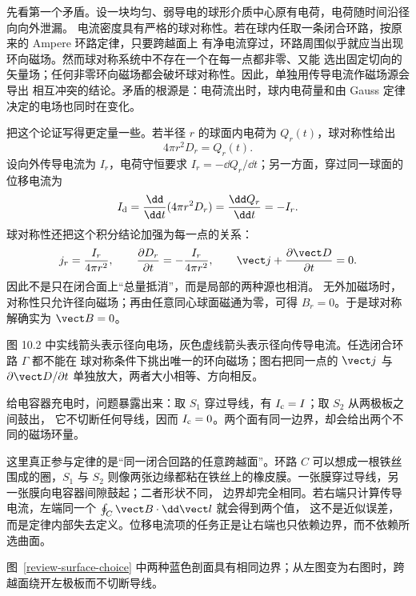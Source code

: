 先看第一个矛盾。设一块均匀、弱导电的球形介质中心原有电荷，电荷随时间沿径向向外泄漏。
电流密度具有严格的球对称性。若在球内任取一条闭合环路，按原来的 Ampere 环路定律，只要跨越面上
有净电流穿过，环路周围似乎就应当出现环向磁场。然而球对称系统中不存在一个在每一点都非零、又能
选出固定切向的矢量场；任何非零环向磁场都会破坏球对称性。因此，单独用传导电流作磁场源会导出
相互冲突的结论。矛盾的根源是：电荷流出时，球内电荷量和由 Gauss 定律决定的电场也同时在变化。

把这个论证写得更定量一些。若半径 $r$ 的球面内电荷为 $Q_r(t)$，球对称性给出
\begin{equation}
  4\pi r^2D_r=Q_r(t).
\end{equation}
设向外传导电流为 $I_r$，电荷守恒要求 $I_r=-\dd Q_r/\dd t$；另一方面，穿过同一球面的位移电流为
\begin{equation}
  I_{\rm d}=\frac{\dd}{\dd t}(4\pi r^2D_r)=\frac{\dd Q_r}{\dd t}=-I_r.
\end{equation}
球对称性还把这个积分结论加强为每一点的关系：
\[
 j_r=\frac{I_r}{4\pi r^2},\qquad
 \frac{\partial D_r}{\partial t}=-\frac{I_r}{4\pi r^2},
 \qquad \vect j+\frac{\partial\vect D}{\partial t}=0.
\]
因此不是只在闭合面上“总量抵消”，而是局部的两种源也相消。
无外加磁场时，对称性只允许径向磁场；再由任意同心球面磁通为零，可得 $B_r=0$。于是球对称解确实为 $\vect B=0$。

图 10.2 中实线箭头表示径向电场，灰色虚线箭头表示径向传导电流。任选闭合环路 $\Gamma$ 都不能在
球对称条件下挑出唯一的环向磁场；图右把同一点的 $\vect j$ 与 $\partial\vect D/\partial t$ 单独放大，两者大小相等、方向相反。

\radialCurrentSphereDiagram

给电容器充电时，问题暴露出来：取 $S_1$ 穿过导线，有 $I_{\rm c}=I$；取 $S_2$ 从两极板之间鼓出，
它不切断任何导线，因而 $I_{\rm c}=0$。两个面有同一边界，却会给出两个不同的磁场环量。

这里真正参与定律的是“同一闭合回路的任意跨越面”。环路 $C$ 可以想成一根铁丝围成的圈，$S_1$ 与
$S_2$ 则像两张边缘都粘在铁丝上的橡皮膜。一张膜穿过导线，另一张膜向电容器间隙鼓起；二者形状不同，
边界却完全相同。若右端只计算传导电流，左端同一个 $\oint_C\vect B\cdot\dd\vect l$ 就会得到两个值，
这不是近似误差，而是定律内部失去定义。位移电流项的任务正是让右端也只依赖边界，而不依赖所选曲面。

图~\ref{review-surface-choice} 中两种蓝色剖面具有相同边界；从左图变为右图时，跨越面绕开左极板而不切断导线。

\displacementCurrentDiagram

